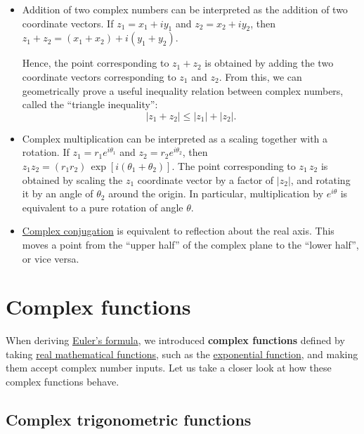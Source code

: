 \documentclass[10pt,a4paper]{article}
\begin{document}
\begin{itemize}
\item
  Addition of two complex numbers can be interpreted as the addition
  of two coordinate vectors. If $z_1 = x_1 + i y_1$ and $z_2 = x_2 + i
  y_2$, then $z_1 + z_2 = \left(x_1 + x_2\right) + i\left(y_1 +
  y_2\right).$

  Hence, the point corresponding to $z_1 + z_2$ is obtained by adding
  the two coordinate vectors corresponding to $z_1$ and $z_2$. From
  this, we can geometrically prove a useful inequality relation
  between complex numbers, called the ``triangle inequality'':
  \begin{equation}
    |z_1 + z_2| \le |z_1| + |z_2|.
  \end{equation}

\item
  Complex multiplication can be interpreted as a scaling together with
  a rotation. If $z_1 = r_1e^{i\theta_1}$ and $z_2 =
  r_2e^{i\theta_2}$, then $z_1 z_2 = \left(r_1 r_2\right)
  \,\exp[i(\theta_1 + \theta_2)]$.  The point corresponding to $z_1 \,
  z_2$ is obtained by scaling the $z_1$ coordinate vector by a factor
  of $|z_2|$, and rotating it by an angle of $\theta_2$ around the
  origin. In particular, multiplication by $e^{i\theta}$ is equivalent
  to a pure rotation of angle $\theta$.

\item
  \hyperref[magnitudes-and-conjugates]{Complex conjugation} is
  equivalent to reflection about the real axis. This moves a point
  from the ``upper half'' of the complex plane to the ``lower half'',
  or vice versa.
\end{itemize}

\section{Complex functions}\label{complex-functions}

When deriving \protect\hyperlink{euler_formula}{Euler's formula}, we
introduced \textbf{complex functions} defined by taking
\href{00_mathfunctions.ipynb}{real mathematical functions}, such as
the \href{00_mathfunctions.ipynb\#exponential}{exponential function},
and making them accept complex number inputs. Let us take a closer
look at how these complex functions behave.

\subsection{Complex trigonometric functions}
\label{complex-trigonometric-functions}
\end{document}
